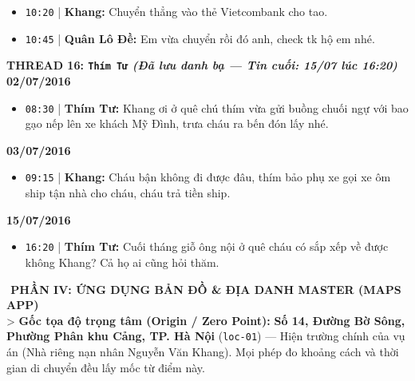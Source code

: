 \documentclass[12pt,a4paper]{article}
\begin{document}
\begin{itemize}[leftmargin=*, itemsep=2pt, topsep=2pt, parsep=0pt]
  \item \texttt{10:20} | \textbf{Khang:} Chuyển thẳng vào thẻ Vietcombank cho tao.
  \item \texttt{10:45} | \textbf{Quân Lô Đề:} Em vừa chuyển rồi đó anh, check tk hộ em nhé.


\end{itemize}

\vspace{0.3cm}\noindent\textbf{\large  THREAD 16: \texttt{Thím Tư} \textit{(Đã lưu danh bạ — Tin cuối: 15/07 lúc 16:20)}}\\[0.15cm]


\textbf{02/07/2016}

\begin{itemize}[leftmargin=*, itemsep=2pt, topsep=2pt, parsep=0pt]
  \item \texttt{08:30} | \textbf{Thím Tư:} Khang ơi ở quê chú thím vừa gửi buồng chuối ngự với bao gạo nếp lên xe khách Mỹ Đình, trưa cháu ra bến đón lấy nhé.

\end{itemize}
\textbf{03/07/2016}

\begin{itemize}[leftmargin=*, itemsep=2pt, topsep=2pt, parsep=0pt]
  \item \texttt{09:15} | \textbf{Khang:} Cháu bận không đi được đâu, thím bảo phụ xe gọi xe ôm ship tận nhà cho cháu, cháu trả tiền ship.

\end{itemize}
\textbf{15/07/2016}

\begin{itemize}[leftmargin=*, itemsep=2pt, topsep=2pt, parsep=0pt]
  \item \texttt{16:20} | \textbf{Thím Tư:} Cuối tháng giỗ ông nội ở quê cháu có sắp xếp về được không Khang? Cả họ ai cũng hỏi thăm.


\end{itemize}

\vspace{0.35cm}\noindent\textbf{\large ️ PHẦN IV: ỨNG DỤNG BẢN ĐỒ \& ĐỊA DANH MASTER (MAPS APP)}\\[0.15cm]


>  \textbf{Gốc tọa độ trọng tâm (Origin / Zero Point):} \textbf{Số 14, Đường Bờ Sông, Phường Phân khu Cảng, TP. Hà Nội} (\texttt{loc-01}) — Hiện trường chính của vụ án (Nhà riêng nạn nhân Nguyễn Văn Khang). Mọi phép đo khoảng cách và thời gian di chuyển đều lấy mốc từ điểm này.
\end{document}
